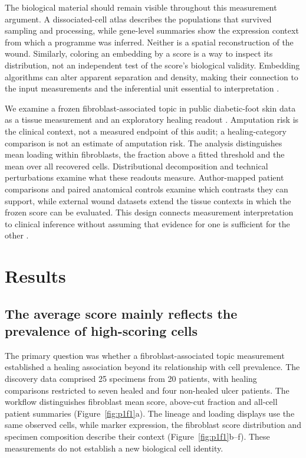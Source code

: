 \documentclass[10pt,a4paper]{article}
\begin{document}
The biological material should remain visible throughout this measurement argument. A dissociated-cell atlas describes the populations that survived sampling and processing, while gene-level summaries show the expression context from which a programme was inferred. Neither is a spatial reconstruction of the wound. Similarly, coloring an embedding by a score is a way to inspect its distribution, not an independent test of the score's biological validity. Embedding algorithms can alter apparent separation and density, making their connection to the input measurements and the inferential unit essential to interpretation \citep{becht2019,huang2022visualization}.

We examine a frozen fibroblast-associated topic in public diabetic-foot skin data as a tissue measurement and an exploratory healing readout \citep{theocharidis2022,cronbach1955}. Amputation risk is the clinical context, not a measured endpoint of this audit; a healing-category comparison is not an estimate of amputation risk. The analysis distinguishes mean loading within fibroblasts, the fraction above a fitted threshold and the mean over all recovered cells. Distributional decomposition and technical perturbations examine what these readouts measure. Author-mapped patient comparisons and paired anatomical controls examine which contrasts they can support, while external wound datasets extend the tissue contexts in which the frozen score can be evaluated. This design connects measurement interpretation to clinical inference without assuming that evidence for one is sufficient for the other \citep{collins2015}.

\section{Results}
\subsection{The average score mainly reflects the prevalence of high-scoring cells}
The primary question was whether a fibroblast-associated topic measurement established a healing association beyond its relationship with cell prevalence. The discovery data comprised 25 specimens from 20 patients, with healing comparisons restricted to seven healed and four non-healed ulcer patients. The workflow distinguishes fibroblast mean score, above-cut fraction and all-cell patient summaries (Figure~\ref{fig:p1f1}a). The lineage and loading displays use the same observed cells, while marker expression, the fibroblast score distribution and specimen composition describe their context (Figure~\ref{fig:p1f1}b--f). These measurements do not establish a new biological cell identity.
\end{document}
